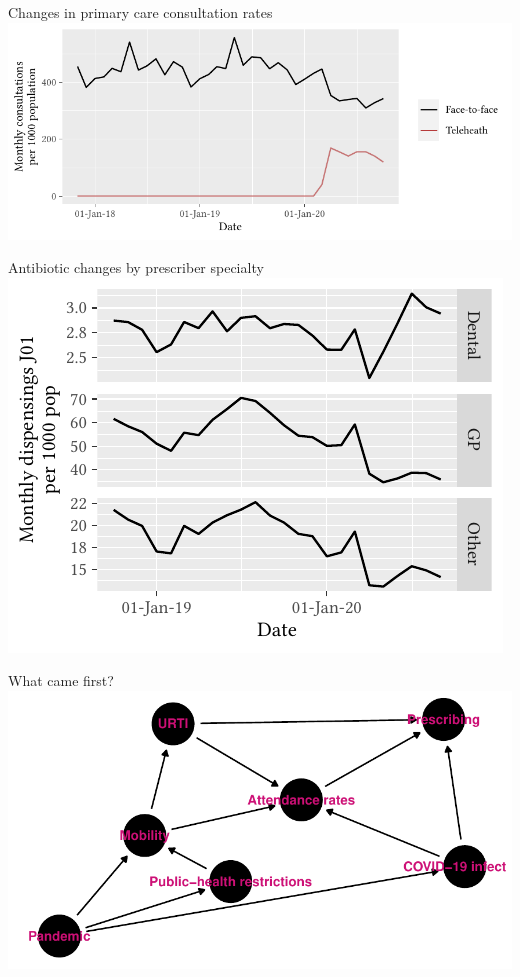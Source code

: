 \documentclass[aspectratio=169,12pt]{beamer} %
\begin{document}
\begin{frame}{Changes in primary care consultation rates}
\centering
\includegraphics{ref/latex-suppmbs-1.pdf}
\nocite{gillies_2022}
\end{frame}

\begin{frame}{Antibiotic changes by prescriber specialty}
\centering
\includegraphics{ref/latex-j01specialty-1.pdf}
\end{frame}

\begin{frame}{What came first?}
\centering
\includegraphics[height=0.8\textheight]
        {ref/dag.pdf}
\end{frame}
\end{document}
